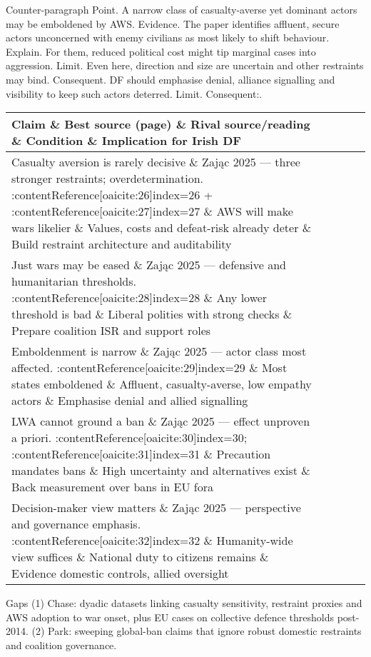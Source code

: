 Counter-paragraph
Point. A narrow class of casualty-averse yet dominant actors may be emboldened by AWS.
Evidence. The paper identifies affluent, secure actors unconcerned with enemy civilians as most likely to shift behaviour.
Explain. For them, reduced political cost might tip marginal cases into aggression.
Limit. Even here, direction and size are uncertain and other restraints may bind.
Consequent. DF should emphasise denial, alliance signalling and visibility to keep such actors deterred. Limit. Consequent:.


\begin{tabular}{p{3.2cm}p{4.2cm}p{3.6cm}p{3.2cm}p{4.2cm}}
	\textbf{Claim} \& \textbf{Best source (page)} \& \textbf{Rival source/reading} \& \textbf{Condition} \& \textbf{Implication for Irish DF}\\\hline
	Casualty aversion is rarely decisive \& Zając 2025 — three stronger restraints; overdetermination. {\small :contentReference[oaicite:26]{index=26} {\tiny +} :contentReference[oaicite:27]{index=27}} \& AWS will make wars likelier \& Values, costs and defeat-risk already deter \& Build restraint architecture and auditability \\
	Just wars may be eased \& Zając 2025 — defensive and humanitarian thresholds. {\small :contentReference[oaicite:28]{index=28}} \& Any lower threshold is bad \& Liberal polities with strong checks \& Prepare coalition ISR and support roles \\
	Emboldenment is narrow \& Zając 2025 — actor class most affected. {\small :contentReference[oaicite:29]{index=29}} \& Most states emboldened \& Affluent, casualty-averse, low empathy actors \& Emphasise denial and allied signalling \\
	LWA cannot ground a ban \& Zając 2025 — effect unproven a priori. {\small :contentReference[oaicite:30]{index=30}; :contentReference[oaicite:31]{index=31}} \& Precaution mandates bans \& High uncertainty and alternatives exist \& Back measurement over bans in EU fora \\
	Decision-maker view matters \& Zając 2025 — perspective and governance emphasis. {\small :contentReference[oaicite:32]{index=32}} \& Humanity-wide view suffices \& National duty to citizens remains \& Evidence domestic controls, allied oversight \\\hline
\end{tabular}

Gaps
(1) Chase: dyadic datasets linking casualty sensitivity, restraint proxies and AWS adoption to war onset, plus EU cases on collective defence thresholds post-2014.
(2) Park: sweeping global-ban claims that ignore robust domestic restraints and coalition governance.

